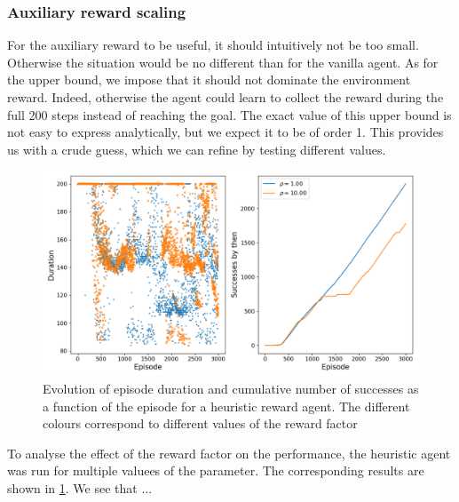 \documentclass[a4paper, 12pt,oneside]{article}
\begin{document}
        \subsubsection{Auxiliary reward scaling}
        For the auxiliary reward to be useful, it should intuitively not be too small. Otherwise the situation would be no different than for the vanilla agent. As for the upper bound, we impose that it should not dominate the environment reward. Indeed, otherwise the agent could learn to collect the reward during the full 200 steps instead of reaching the goal. The exact value of this upper bound is not easy to express analytically, but we expect it to be of order 1. This provides us with a crude guess, which we can refine by testing different values.
        \begin{figure}[h!]
            \centering
            \vspace{0em}
            \includegraphics[width=.75\textwidth]{../runs/dqn_heuristic/comparison}
            \caption{Evolution of episode duration and cumulative number of successes as a function of the episode for a heuristic reward agent. The different colours correspond to different values of the reward factor}
            \label{fig:dqn-heuristic-comparison}
        \end{figure}
        To analyse the effect of the reward factor on the performance, the heuristic agent was run for multiple valuees of the parameter. The corresponding results are shown in \ref{fig:dqn-heuristic-comparison}. We see that ...
\end{document}
